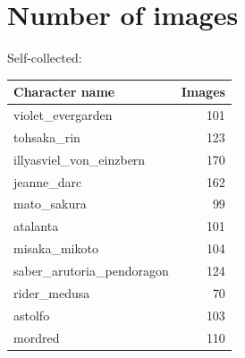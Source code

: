 \documentclass[11.5pt]{article}
\begin{document}
    \newpage
    
    {}

    \clearpage
    \twocolumn
    \appendix
    \appendixpage
    \addappheadtotoc


    \section{Number of images}\label{sec:dataset-information}

    Self-collected: \vspace{3mm}\\
    \begin{supertabular}[h!]{lr}
        Character name & Images \\ \hline
        violet\_evergarden & 101 \\
        tohsaka\_rin & 123 \\
        illyasviel\_von\_einzbern & 170 \\
        jeanne\_darc & 162 \\
        mato\_sakura & 99 \\
        atalanta & 101 \\
        misaka\_mikoto & 104 \\
        saber\_arutoria\_pendoragon & 124 \\
        rider\_medusa & 70 \\
        astolfo & 103 \\
        mordred & 110 \\
    \end{supertabular} \vspace{10mm} \\
\end{document}
